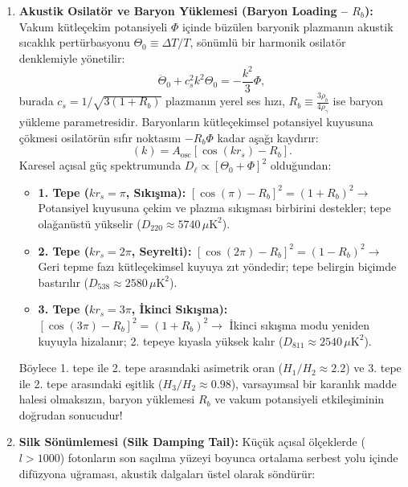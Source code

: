 \begin{enumerate}
    \item \textbf{Akustik Osilatör ve Baryon Yüklemesi (Baryon Loading -- $R_b$):}
          Vakum kütleçekim potansiyeli $\Phi$ içinde büzülen baryonik plazmanın akustik sıcaklık pertürbasyonu $\Theta_0 \equiv \Delta T / T$, sönümlü bir harmonik osilatör denklemiyle yönetilir:
          \begin{equation}
              \ddot{\Theta}_0 + c_s^2 k^2 \Theta_0 = - \frac{k^2}{3} \Phi,
          \end{equation}
          burada $c_s = 1/\sqrt{3(1 + R_b)}$ plazmanın yerel ses hızı, $R_b \equiv \frac{3 \rho_b}{4 \rho_\gamma}$ ise baryon yükleme parametresidir. Baryonların kütleçekimsel potansiyel kuyusuna çökmesi osilatörün sıfır noktasını $-R_b \Phi$ kadar aşağı kaydırır:
          \begin{equation}
              [\Theta_0 + \Phi](k) = A_{\mathrm{osc}} \left[ \cos(k r_s) - R_b \right].
          \end{equation}
          Karesel açısal güç spektrumunda $D_\ell \propto [\Theta_0 + \Phi]^2$ olduğundan:
          \begin{itemize}
              \item \textbf{1. Tepe ($k r_s = \pi$, Sıkışma):} $[\cos(\pi) - R_b]^2 = (1 + R_b)^2 \to$ Potansiyel kuyusuna çekim ve plazma sıkışması birbirini destekler; tepe olağanüstü yükselir ($D_{220} \approx 5740\,\mu\mathrm{K}^2$).
              \item \textbf{2. Tepe ($k r_s = 2\pi$, Seyrelti):} $[\cos(2\pi) - R_b]^2 = (1 - R_b)^2 \to$ Geri tepme fazı kütleçekimsel kuyuya zıt yöndedir; tepe belirgin biçimde bastırılır ($D_{538} \approx 2580\,\mu\mathrm{K}^2$).
              \item \textbf{3. Tepe ($k r_s = 3\pi$, İkinci Sıkışma):} $[\cos(3\pi) - R_b]^2 = (1 + R_b)^2 \to$ İkinci sıkışma modu yeniden kuyuyla hizalanır; 2. tepeye kıyasla yüksek kalır ($D_{811} \approx 2540\,\mu\mathrm{K}^2$).
          \end{itemize}
          Böylece 1. tepe ile 2. tepe arasındaki asimetrik oran ($H_1 / H_2 \approx 2.2$) ve 3. tepe ile 2. tepe arasındaki eşitlik ($H_3 / H_2 \approx 0.98$), varsayımsal bir karanlık madde halesi olmaksızın, baryon yüklemesi $R_b$ ve vakum potansiyeli etkileşiminin doğrudan sonucudur!
    \item \textbf{Silk Sönümlemesi (Silk Damping Tail):}
          Küçük açısal ölçeklerde ($l > 1000$) fotonların son saçılma yüzeyi boyunca ortalama serbest yolu içinde difüzyona uğraması, akustik dalgaları üstel olarak söndürür:

\end{enumerate}
